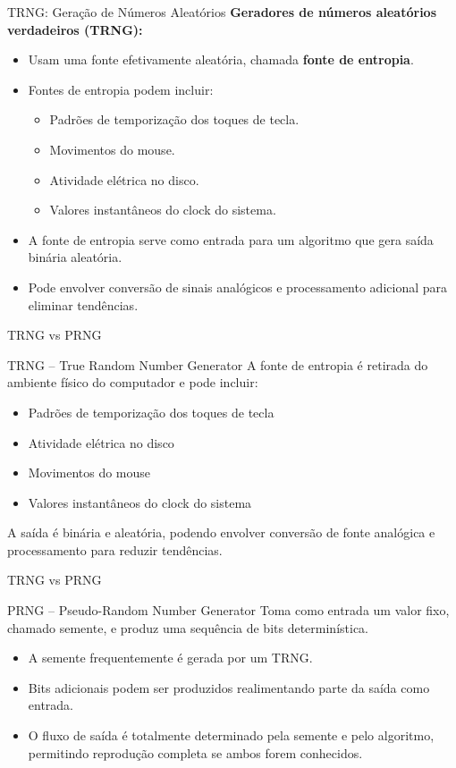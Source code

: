 \begin{frame}{TRNG: Geração de Números Aleatórios}
\textbf{Geradores de números aleatórios verdadeiros (TRNG):}
\begin{itemize}
    \item Usam uma fonte efetivamente aleatória, chamada \textbf{fonte de entropia}.
    \item Fontes de entropia podem incluir:
    \begin{itemize}
        \item Padrões de temporização dos toques de tecla.
        \item Movimentos do mouse.
        \item Atividade elétrica no disco.
        \item Valores instantâneos do clock do sistema.
    \end{itemize}
    \item A fonte de entropia serve como entrada para um algoritmo que gera saída binária aleatória.
    \item Pode envolver conversão de sinais analógicos e processamento adicional para eliminar tendências.
\end{itemize}



\end{frame}

\begin{frame}{TRNG vs PRNG}
\begin{block}{TRNG – True Random Number Generator}
A fonte de entropia é retirada do ambiente físico do computador e pode incluir:
\begin{itemize}
    \item Padrões de temporização dos toques de tecla
    \item Atividade elétrica no disco
    \item Movimentos do mouse
    \item Valores instantâneos do clock do sistema
\end{itemize}
A saída é binária e aleatória, podendo envolver conversão de fonte analógica e processamento para reduzir tendências.
\end{block}


\end{frame}

\begin{frame}{TRNG vs PRNG}


\begin{block}{PRNG – Pseudo-Random Number Generator}
Toma como entrada um valor fixo, chamado semente, e produz uma sequência de bits determinística.
\begin{itemize}
    \item A semente frequentemente é gerada por um TRNG.
    \item Bits adicionais podem ser produzidos realimentando parte da saída como entrada.
    \item O fluxo de saída é totalmente determinado pela semente e pelo algoritmo, permitindo reprodução completa se ambos forem conhecidos.
\end{itemize}
\end{block}
\end{frame}


